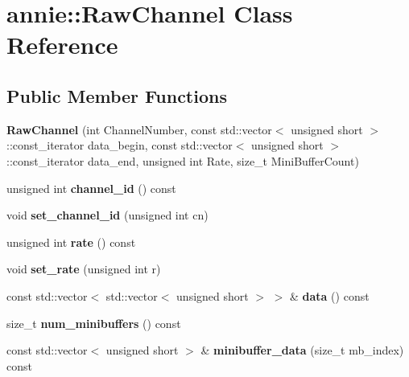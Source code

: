 \hypertarget{classannie_1_1RawChannel}{
\section{annie::RawChannel Class Reference}
\label{classannie_1_1RawChannel}
}
\subsection*{Public Member Functions}
\begin{DoxyCompactItemize}
\item 
\hypertarget{classannie_1_1RawChannel_a27e98df7b68a50a45eb37897a05e5cb9}{
{\bfseries RawChannel} (int ChannelNumber, const std::vector$<$ unsigned short $>$::const\_\-iterator data\_\-begin, const std::vector$<$ unsigned short $>$::const\_\-iterator data\_\-end, unsigned int Rate, size\_\-t MiniBufferCount)}
\label{classannie_1_1RawChannel_a27e98df7b68a50a45eb37897a05e5cb9}

\item 
\hypertarget{classannie_1_1RawChannel_a3373ebec56399dedccffd7500a1037d8}{
unsigned int {\bfseries channel\_\-id} () const }
\label{classannie_1_1RawChannel_a3373ebec56399dedccffd7500a1037d8}

\item 
\hypertarget{classannie_1_1RawChannel_aeda7fd3faeaeff8677774891028df7ca}{
void {\bfseries set\_\-channel\_\-id} (unsigned int cn)}
\label{classannie_1_1RawChannel_aeda7fd3faeaeff8677774891028df7ca}

\item 
\hypertarget{classannie_1_1RawChannel_a8fd58d4ca2ffbf5640182d245b90427f}{
unsigned int {\bfseries rate} () const }
\label{classannie_1_1RawChannel_a8fd58d4ca2ffbf5640182d245b90427f}

\item 
\hypertarget{classannie_1_1RawChannel_adf62dc9e7c6a19fa7cb9e52b6a444e46}{
void {\bfseries set\_\-rate} (unsigned int r)}
\label{classannie_1_1RawChannel_adf62dc9e7c6a19fa7cb9e52b6a444e46}

\item 
\hypertarget{classannie_1_1RawChannel_a8810255f132ada05b9c2a22cedbceb3c}{
const std::vector$<$ std::vector$<$ unsigned short $>$ $>$ \& {\bfseries data} () const }
\label{classannie_1_1RawChannel_a8810255f132ada05b9c2a22cedbceb3c}

\item 
\hypertarget{classannie_1_1RawChannel_a3f5a72a2bb549ac062bc7f11bf575e8f}{
size\_\-t {\bfseries num\_\-minibuffers} () const }
\label{classannie_1_1RawChannel_a3f5a72a2bb549ac062bc7f11bf575e8f}

\item 
\hypertarget{classannie_1_1RawChannel_a0900f9b35249c2d47ab144c695e47e63}{
const std::vector$<$ unsigned short $>$ \& {\bfseries minibuffer\_\-data} (size\_\-t mb\_\-index) const }
\label{classannie_1_1RawChannel_a0900f9b35249c2d47ab144c695e47e63}

\end{DoxyCompactItemize}
